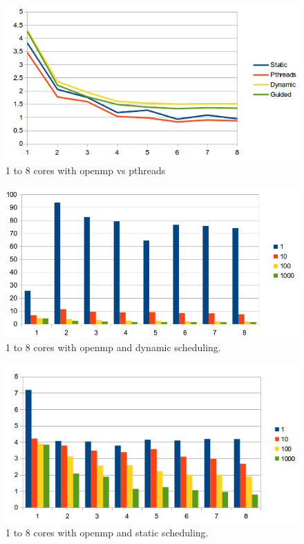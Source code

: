 \documentclass[10pt]{article}
\begin{document}
\begin{figure}[h]
  \centering
    \includegraphics[width=\textwidth]{compare.png}
  \caption{1 to 8 cores with openmp vs pthreads}
\end{figure}
\break
\begin{figure}[h]
  \centering
    \includegraphics[width=\textwidth]{dynamic.png}
  \caption{1 to 8 cores with openmp and dynamic scheduling.}
\end{figure}
\break
\begin{figure}[h]
  \centering
    \includegraphics[width=\textwidth]{static.png}
  \caption{1 to 8 cores with openmp and static scheduling.}
\end{figure}
\end{document}
